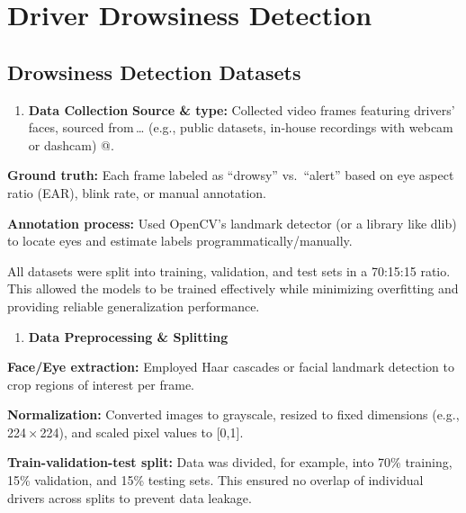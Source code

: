 \documentclass[
  letterpaper,
  DIV=11,
  numbers=noendperiod]{scrreport}
\providecommand{\tightlist}{%
  \setlength{\itemsep}{0pt}\setlength{\parskip}{0pt}}
\begin{document}
\section{\texorpdfstring{\textbf{Driver Drowsiness
Detection}}{Driver Drowsiness Detection}}\label{driver-drowsiness-detection}

\subsection{\texorpdfstring{\textbf{Drowsiness Detection
Datasets}}{Drowsiness Detection Datasets}}\label{drowsiness-detection-datasets}

\begin{enumerate}
\def\labelenumi{\arabic{enumi}.}
\tightlist
\item
  \textbf{Data Collection} \textbf{Source \& type:} Collected video
  frames featuring drivers' faces, sourced from\,\ldots{} (e.g., public
  datasets, in‑house recordings with webcam or dashcam) @.
\end{enumerate}

\textbf{Ground truth:} Each frame labeled as ``drowsy'' vs.~``alert''
based on eye aspect ratio (EAR), blink rate, or manual annotation.

\textbf{Annotation process:} Used OpenCV's landmark detector (or a
library like dlib) to locate eyes and estimate labels
programmatically/manually.

All datasets were split into training, validation, and test sets in a
70:15:15 ratio. This allowed the models to be trained effectively while
minimizing overfitting and providing reliable generalization
performance.

\begin{enumerate}
\def\labelenumi{\arabic{enumi}.}
\setcounter{enumi}{1}
\tightlist
\item
  \textbf{Data Preprocessing \& Splitting}
\end{enumerate}

\textbf{Face/Eye extraction:} Employed Haar cascades or facial landmark
detection to crop regions of interest per frame.

\textbf{Normalization:} Converted images to grayscale, resized to fixed
dimensions (e.g., 224\,×\,224), and scaled pixel values to {[}0,1{]}.

\textbf{Train-validation-test split:} Data was divided, for example,
into 70\% training, 15\% validation, and 15\% testing sets. This ensured
no overlap of individual drivers across splits to prevent data leakage.
\end{document}
